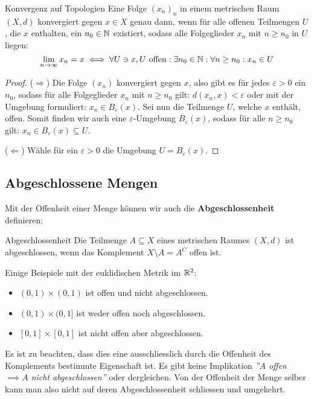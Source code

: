 \begin{satz}{Konvergenz auf Topologien}{}
Eine Folge $(x_n)_n$ in einem metrischen Raum $(X, d)$ konvergiert gegen $x \in X$ genau dann, wenn für alle offenen Teilmengen $U$, die $x$ enthalten, ein $n_0 \in \mathbb{N}$ existiert, sodass alle Folgeglieder $x_n$ mit $n\geq n_0$ in $U$ liegen:
$$\lim_{n \to \infty} x_n = x \iff \forall U \ni x, U \text{ offen}: \exists n_0 \in \mathbb{N}: \forall n \geq n_0 : x_n \in U$$
\end{satz}
\begin{proof}
($\Longrightarrow$) Die Folge $(x_n)$ konvergiert gegen $x$, also gibt es für jedes $\varepsilon >0$ ein $n_0$, sodass für alle Folgeglieder $x_n$ mit $n \geq n_0$ gilt: $d(x_n, x) < \varepsilon$ oder mit der Umgebung formuliert: $x_n \in B_\varepsilon(x)$. Sei nun die Teilmenge $U$, welche $x$ enthält, offen. Somit finden wir auch eine $\varepsilon$-Umgebung $B_\varepsilon(x)$, sodass für alle $n\geq n_0$ gilt: $x_n \in B_\varepsilon(x) \subseteq U$.

($\Longleftarrow$) Wähle für ein $\varepsilon > 0$ die Umgebung $U = B_\varepsilon(x)$.
\end{proof}

\subsection{Abgeschlossene Mengen}
Mit der Offenheit einer Menge können wir auch die \textbf{Abgeschlossenheit} definieren:
\begin{definition}{Abgeschlossenheit}{}
Die Teilmenge $A \subseteq X$ eines metrischen Raumes $(X,d)$ ist abgeschlossen, wenn das Komplement $X\setminus A = A^C$ offen ist.
\end{definition}
\begin{example}Einige Beispiele mit der euklidischen Metrik im $\mathbb{R}^2$:
\begin{itemize}
    \item $(0,1) \times (0,1)$ ist offen und nicht abgeschlossen.
    \item $(0,1) \times (0,1]$ ist weder offen noch abgeschlossen.
    \item $[0,1] \times [0,1]$ ist nicht offen aber abgeschlossen.
\end{itemize}
\begin{remark}
Es ist zu beachten, dass dies eine ausschliesslich durch die Offenheit des Komplements bestimmte Eigenschaft ist. Es gibt keine Implikation \textit{''$A$ offen $\implies A$ nicht abgeschlossen''} oder dergleichen. Von der Offenheit der Menge selber kann man also nicht auf deren Abgeschlossenheit schliessen und umgekehrt.
\end{remark}
\end{example}

